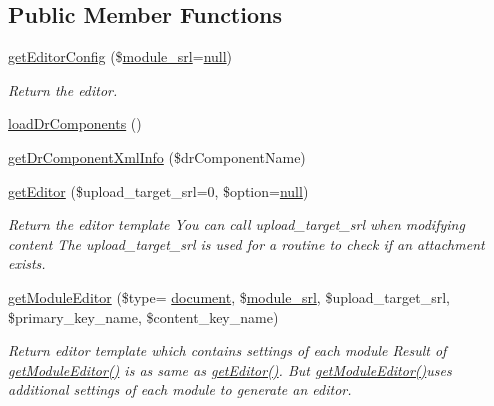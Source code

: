 \subsection*{Public Member Functions}
\begin{DoxyCompactItemize}
\item 
\hyperlink{classeditorModel_a66f732bbdd500d31fb39fd03eb8d46b5}{get\+Editor\+Config} (\$\hyperlink{ko_8install_8php_a370bb6450fab1da3e0ed9f484a38b761}{module\+\_\+srl}=\hyperlink{modernizr_8min_8js_a286f9ec831c5e676eeb493248eab9575}{null})
\begin{DoxyCompactList}\small\item\em Return the editor. \end{DoxyCompactList}\item 
\hyperlink{classeditorModel_a1ad866d4c1ab454b9d0b72c8d3cc29bd}{load\+Dr\+Components} ()
\item 
\hyperlink{classeditorModel_a580e31ed0fff869a97d5fe598975e960}{get\+Dr\+Component\+Xml\+Info} (\$dr\+Component\+Name)
\item 
\hyperlink{classeditorModel_a77477c0a6d333b3230f77904d96d93c5}{get\+Editor} (\$upload\+\_\+target\+\_\+srl=0, \$option=\hyperlink{modernizr_8min_8js_a286f9ec831c5e676eeb493248eab9575}{null})
\begin{DoxyCompactList}\small\item\em Return the editor template You can call upload\+\_\+target\+\_\+srl when modifying content The upload\+\_\+target\+\_\+srl is used for a routine to check if an attachment exists. \end{DoxyCompactList}\item 
\hyperlink{classeditorModel_a7870d2a76cbc33a9dbaea3f865edd313}{get\+Module\+Editor} (\$type= \textquotesingle{}\hyperlink{classdocument}{document}\textquotesingle{}, \$\hyperlink{ko_8install_8php_a370bb6450fab1da3e0ed9f484a38b761}{module\+\_\+srl}, \$upload\+\_\+target\+\_\+srl, \$primary\+\_\+key\+\_\+name, \$content\+\_\+key\+\_\+name)
\begin{DoxyCompactList}\small\item\em Return editor template which contains settings of each module Result of \hyperlink{classeditorModel_a7870d2a76cbc33a9dbaea3f865edd313}{get\+Module\+Editor()} is as same as \hyperlink{classeditorModel_a77477c0a6d333b3230f77904d96d93c5}{get\+Editor()}. But \hyperlink{classeditorModel_a7870d2a76cbc33a9dbaea3f865edd313}{get\+Module\+Editor()}uses additional settings of each module to generate an editor. \end{DoxyCompactList}\item 

\end{DoxyCompactItemize}

